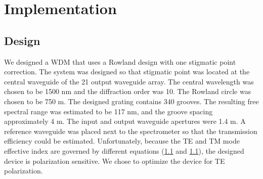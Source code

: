 \documentclass[12pt,twoside,english]{book}
\renewcommand{\~}{\perispomeni}%
\DeclareRobustCommand{\textgreek}[1]{\leavevmode{\greektext #1}}
\numberwithin{equation}{section}
\numberwithin{figure}{section}
\begin{document}
\section{Implementation}
\label{section:implementation}




\subsection{Design}
We designed a \gls{WDM} that uses a Rowland design with one stigmatic point correction. The system was designed so that stigmatic point was located at the central waveguide of the 21 output waveguide array. The central wavelength was chosen to be 1500 nm and the diffraction order was 10. The Rowland circle was chosen to be 750 \textgreek{m}m. The designed grating contains 340 grooves. The resulting free spectral range was estimated to be 117 nm, and the groove spacing approximately 4 \textgreek{m}m. The input and output waveguide apertures were 1.4 \textgreek{m}m. A reference waveguide was placed next to the spectrometer so that the transmission efficiency could be estimated. Unfortunately, because the TE and TM mode effective index are governed by different equations (\ref{} and \ref{}), the designed device is polarization sensitive. We chose to optimize the device for TE polarization.
\end{document}
